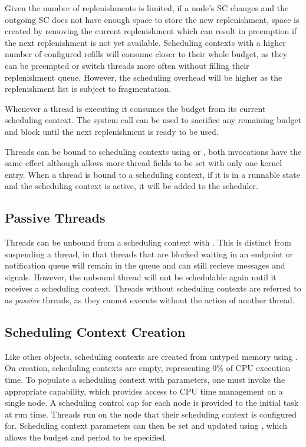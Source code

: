 Given the number of replenishments is limited, if a node's SC changes and the outgoing SC does not
have enough space to store the new replenishment, space is created by removing the current
replenishment which can result in preemption if the next replenishment is not yet available.
Scheduling contexts with a higher number of configured refills will consume closer
to their whole budget, as they can be preempted or switch threads more often without filling their
replenishment queue. However, the scheduling overhead will be higher as the replenishment list is
subject to fragmentation.

Whenever a thread is executing it consumes the budget from its current scheduling context.  The
system call  can be used to sacrifice any remaining budget and
block until the next replenishment is ready to be used.

Threads can be bound to scheduling contexts using  or
, both invocations have the same effect
although  allows more thread fields to be set with only
one kernel entry.  When a thread is bound to a scheduling context, if it is in a runnable state and
the scheduling context is active, it will be added to the scheduler.

\subsection{Passive Threads} \label{sec:passive}

Threads can be unbound from a scheduling context with
.  This is distinct from
suspending a thread, in that threads that are blocked waiting in an endpoint or notification queue
will remain in the queue and can still recieve messages and signals.  However, the unbound thread
will not be schedulable again until it receives a scheduling context.  Threads without scheduling
contexts are referred to as \emph{passive} threads, as they cannot execute without the action of
another thread.

\subsection{Scheduling Context Creation} \label{sec:sc_creation}

Like other objects, scheduling contexts are created from untyped memory using
.  On creation, scheduling contexts are empty,
representing 0\% of CPU execution time.  To populate a scheduling context with parameters, one must
invoke the appropriate  capability, which provides access to CPU time management
on a single node.  A scheduling control cap for each node is provided to the initial task at run
time.  Threads run on the node that their scheduling context is configured for.  Scheduling context
parameters can then be set and updated using
, which allows the budget and period
to be specified.

